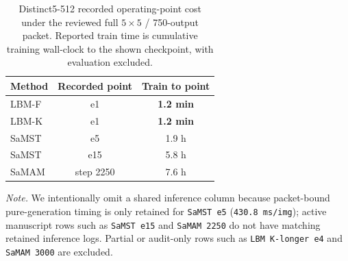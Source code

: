 
\begin{table}[t]
\centering
\footnotesize
\setlength{\tabcolsep}{4pt}
\caption{Distinct5-512 recorded operating-point cost under the reviewed full $5\times5$ / 750-output packet. Reported train time is cumulative training wall-clock to the shown checkpoint, with evaluation excluded.}
\label{tab:cost_distinct5_sidecar}
\begin{tabular}{@{}lcc@{}}
\toprule
Method & Recorded point & Train to point \\
\midrule
LBM-F & e1 & \textbf{1.2 min} \\
LBM-K & e1 & \textbf{1.2 min} \\
SaMST & e5 & 1.9 h \\
SaMST & e15 & 5.8 h \\
SaMAM & step 2250 & 7.6 h \\
\bottomrule
\end{tabular}

\vspace{2pt}
\parbox{0.98\linewidth}{\raggedright\footnotesize\textit{Note.} We intentionally omit a shared inference column because packet-bound pure-generation timing is only retained for \texttt{SaMST e5} (\texttt{430.8 ms/img}); active manuscript rows such as \texttt{SaMST e15} and \texttt{SaMAM 2250} do not have matching retained inference logs. Partial or audit-only rows such as \texttt{LBM K-longer e4} and \texttt{SaMAM 3000} are excluded.}
\end{table}
